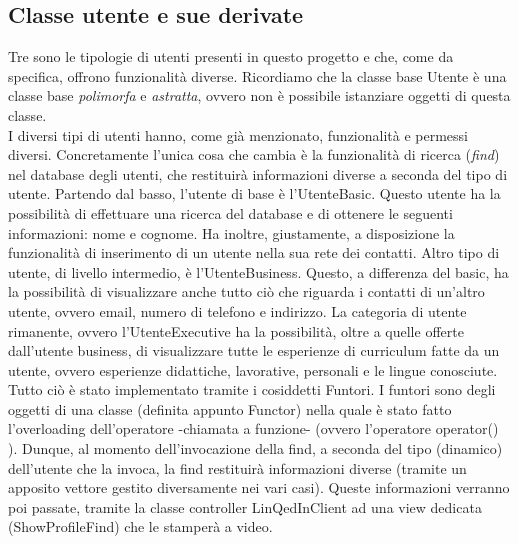 \documentclass[openany, a4paper,11pt] {report}
\begin{document}
\subsection{Classe utente e sue derivate}
Tre sono le tipologie di utenti presenti in questo progetto e che, come da specifica, offrono funzionalità diverse. Ricordiamo che la classe base Utente è una classe base \textsl{polimorfa} e \textsl{astratta}, ovvero non è possibile istanziare oggetti di questa classe.\\
I diversi tipi di utenti hanno, come già menzionato, funzionalità e permessi diversi. Concretamente l'unica cosa che cambia è la funzionalità di ricerca (\textsl{find}) nel database degli utenti, che restituirà informazioni diverse a seconda del tipo di utente. Partendo dal basso, l'utente di base è l'\textsf{UtenteBasic}. Questo utente ha la possibilità di effettuare una ricerca del database e di ottenere le seguenti informazioni: nome e cognome. Ha inoltre, giustamente, a disposizione la funzionalità di inserimento di un utente nella sua rete dei contatti. Altro tipo di utente, di livello intermedio, è l'\textsf{UtenteBusiness}. Questo, a differenza del basic, ha la possibilità di visualizzare anche tutto ciò che riguarda i contatti di un'altro utente, ovvero email, numero di telefono e indirizzo. La categoria di utente rimanente, ovvero l'\textsf{UtenteExecutive} ha la possibilità, oltre a quelle offerte dall'utente business, di visualizzare tutte le esperienze di curriculum fatte da un utente, ovvero esperienze didattiche, lavorative, personali e le lingue conosciute.\\
Tutto ciò è stato implementato tramite i cosiddetti \textsf{Funtori}. I funtori sono degli oggetti di una classe (definita appunto Functor) nella quale è stato fatto l'overloading dell'operatore -chiamata a funzione- (ovvero l'operatore \textsf{operator()} ). Dunque, al momento dell'invocazione della find, a seconda del tipo (dinamico) dell'utente che la invoca, la find restituirà informazioni diverse (tramite un apposito vettore gestito diversamente nei vari casi). Queste informazioni verranno poi passate, tramite la classe controller \textsf{LinQedInClient} ad una view dedicata (\textsf{ShowProfileFind}) che le stamperà a video.
\end{document}

